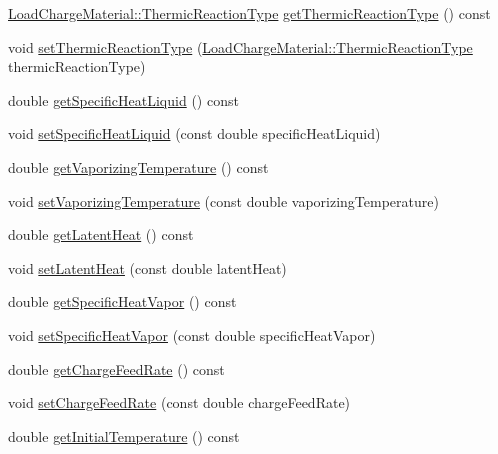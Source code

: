 \begin{DoxyCompactItemize}
\item 
\hyperlink{class_load_charge_material_a51d4263e865a5d86236622dd3fe23fd1}{Load\+Charge\+Material\+::\+Thermic\+Reaction\+Type} \hyperlink{class_liquid_load_charge_material_a181337f5e5cf6a47b82dd56897b49c29}{get\+Thermic\+Reaction\+Type} () const
\item 
void \hyperlink{class_liquid_load_charge_material_a39c258d0bfdcfa352590d411a8c4e882}{set\+Thermic\+Reaction\+Type} (\hyperlink{class_load_charge_material_a51d4263e865a5d86236622dd3fe23fd1}{Load\+Charge\+Material\+::\+Thermic\+Reaction\+Type} thermic\+Reaction\+Type)
\item 
double \hyperlink{class_liquid_load_charge_material_aa698f1f73dff91951139a4a50582963d}{get\+Specific\+Heat\+Liquid} () const
\item 
void \hyperlink{class_liquid_load_charge_material_a2187c4c6ba394c05ab42e769bf175683}{set\+Specific\+Heat\+Liquid} (const double specific\+Heat\+Liquid)
\item 
double \hyperlink{class_liquid_load_charge_material_a07004e345fb4ff287d435d0c84027973}{get\+Vaporizing\+Temperature} () const
\item 
void \hyperlink{class_liquid_load_charge_material_a50938e3270de5d3c59b872f290a761cc}{set\+Vaporizing\+Temperature} (const double vaporizing\+Temperature)
\item 
double \hyperlink{class_liquid_load_charge_material_aca3a38eb3343144042e9349b053da1bc}{get\+Latent\+Heat} () const
\item 
void \hyperlink{class_liquid_load_charge_material_a01d2d23580f27aa9e5cba1124635a677}{set\+Latent\+Heat} (const double latent\+Heat)
\item 
double \hyperlink{class_liquid_load_charge_material_ac4538f9722bf25465ec86586469a7b1e}{get\+Specific\+Heat\+Vapor} () const
\item 
void \hyperlink{class_liquid_load_charge_material_ae95faf01cf6293ab282b1b7fe3b849e1}{set\+Specific\+Heat\+Vapor} (const double specific\+Heat\+Vapor)
\item 
double \hyperlink{class_liquid_load_charge_material_af818c541527b3b28a8f84a08dc0c884e}{get\+Charge\+Feed\+Rate} () const
\item 
void \hyperlink{class_liquid_load_charge_material_a23d6aa6f15a124ddb1504261347b0b82}{set\+Charge\+Feed\+Rate} (const double charge\+Feed\+Rate)
\item 
double \hyperlink{class_liquid_load_charge_material_ab80229a78f884fb07e756665a616d401}{get\+Initial\+Temperature} () const
\item 

\end{DoxyCompactItemize}
